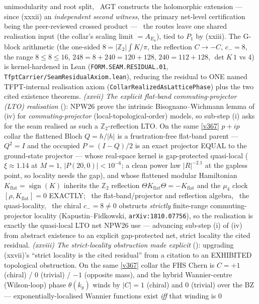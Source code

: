 \documentclass[11pt,a4paper]{article}
\newcommand{\Z}{\mathbb Z}
\begin{document}
\begin{keybox}
unimodularity and root split, \mC\ AGT constructs the holomorphic extension --- since (xxxii) an \emph{independent
second witness}, the primary net-level certification being the peer-reviewed crossed product --- \mO\ the routes
leave one shared realisation input (the collar's scaling limit $={}A_{E_8}$), tied to $P_1$ by (xxiii). The G-block arithmetic
(the one-sided $8{=}|\Z_2|\!\int\!K/\pi$, the reflection $C{\to}{-}C$, $c_-{=}8$, the range $8{\le}8{\le}16$,
$248{=}8{+}240{=}120{+}128$, $240{=}112{+}128$, $\det K\,1$ vs $4$) is kernel-hardened in Lean
(\texttt{FORM.SEAM.RESIDUAL.01}, \texttt{TfptCarrier/SeamResidualAxiom.lean}), reducing the residual to ONE named
TFPT-internal realisation axiom (\texttt{CollarRealizedAsLatticePhase}) plus the two cited existence theorems.
\emph{(xxvii) The explicit flat-band commuting-projector (LTO) realisation} (): NPW26
prove the intrinsic Bisognano--Wichmann lemma of (iv) for \emph{commuting-projector} (local-topological-order)
models, so sub-step (i) asks for the seam realised as such a $\Z_2$-reflection LTO. On the same \vref{v367}
$p{+}ip$ collar the flattened Bloch $Q{=}h/|h|$ is a frustration-free flat-band parent --- $Q^2{=}I$ and the
occupied $P{=}(I{-}Q)/2$ is an exact projector EQUAL to the ground-state projector --- whose real-space kernel is
gap-protected quasi-local ($\xi{\approx}1.14$ at $M{=}1$, $|P(20,0)|{<}10^{-6}$; a clean power law $|R|^{-2.1}$ at the
gapless point, so locality needs the gap), and whose flattened modular Hamiltonian $K_{\mathrm{flat}}{=}
\operatorname{sign}(K)$ inherits the $\Z_2$ reflection $\Theta K_{\mathrm{flat}}\Theta{=}{-}K_{\mathrm{flat}}$ and the
$\mu_4$ clock $[\rho,K_{\mathrm{flat}}]{=}0$ EXACTLY; \mE\ the flat-band/projector and reflection algebra, \mC\ the
quasi-locality, \mO\ the chiral $c_-{=}8{\neq}0$ obstructs \emph{strictly} finite-range commuting-projector locality
(Kapustin--Fidkowski, \texttt{arXiv:1810.07756}), so the realisation is exactly the quasi-local LTO net NPW26 use ---
advancing sub-step (i) of (iv) from abstract existence to an explicit gap-protected net, strict locality the cited
residual. \emph{(xxviii) The strict-locality obstruction made explicit} ():
upgrading (xxvii)'s ``strict locality is the cited residual'' from a citation to an EXHIBITED topological
obstruction. On the same \vref{v367} collar the FHS Chern is $C{=}{+}1$ (chiral) / $0$ (trivial) / $-1$
(opposite mass), and the hybrid Wannier-centre (Wilson-loop) phase $\theta(k_y)$ winds by $|C|{=}1$ (chiral) and
$0$ (trivial) over the BZ --- exponentially-localised Wannier functions exist \emph{iff} that winding is $0$

\end{keybox}
\end{document}

